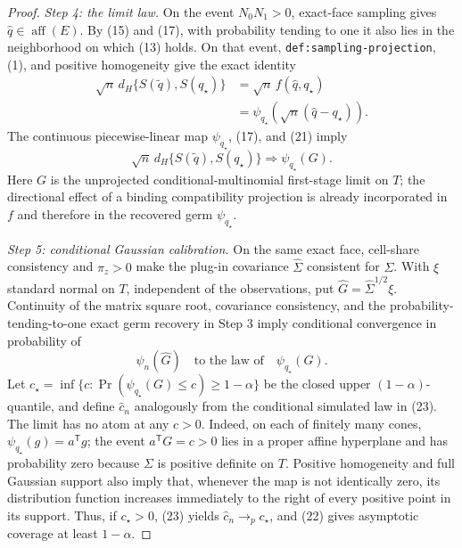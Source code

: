 \documentclass{article}
\begin{document}
\begin{proof}
\emph{Step 4: the limit law.}
On the event \(N_0N_1>0\), exact-face sampling gives \(\widehat q\in\operatorname{aff}(E)\).  By (15) and (17), with probability tending to one it also lies in the neighborhood on which (13) holds.  On that event, \texttt{def:sampling-projection}, (1), and positive homogeneity give the exact identity
\[
\begin{split}
 \sqrt n\,d_H\{S(\widetilde q),S(q_\star)\}
 &=\sqrt n\,f(\widehat q,q_\star)\\
 &=\psi_{q_\star}\!\left(\sqrt n(\widehat q-q_\star)\right).
\end{split}
\tag{21}
\]
The continuous piecewise-linear map \(\psi_{q_\star}\), (17), and (21) imply
\[
 \sqrt n\,d_H\{S(\widetilde q),S(q_\star)\}
 \Rightarrow \psi_{q_\star}(G).
\tag{22}
\]
Here \(G\) is the unprojected conditional-multinomial first-stage limit on \(T\); the directional effect of a binding compatibility projection is already incorporated in \(f\) and therefore in the recovered germ \(\psi_{q_\star}\).

\emph{Step 5: conditional Gaussian calibration.}
On the same exact face, cell-share consistency and \(\pi_z>0\) make the plug-in covariance \(\widehat\Sigma\) consistent for \(\Sigma\).  With \(\xi\) standard normal on \(T\), independent of the observations, put \(\widehat G=\widehat\Sigma^{1/2}\xi\).  Continuity of the matrix square root, covariance consistency, and the probability-tending-to-one exact germ recovery in Step 3 imply conditional convergence in probability of
\[
 \widehat\psi_n(\widehat G)
 \quad\text{to the law of}\quad
 \psi_{q_\star}(G).
\tag{23}
\]
Let \(c_\star=\inf\{c:\Pr(\psi_{q_\star}(G)\leq c)\geq1-\alpha\}\) be the closed upper \((1-\alpha)\)-quantile, and define \(\widehat c_n\) analogously from the conditional simulated law in (23).  The limit has no atom at any \(c>0\).  Indeed, on each of finitely many cones, \(\psi_{q_\star}(g)=a^{\mathsf T}g\); the event \(a^{\mathsf T}G=c>0\) lies in a proper affine hyperplane and has probability zero because \(\Sigma\) is positive definite on \(T\).  Positive homogeneity and full Gaussian support also imply that, whenever the map is not identically zero, its distribution function increases immediately to the right of every positive point in its support.  Thus, if \(c_\star>0\), (23) yields \(\widehat c_n\to_p c_\star\), and (22) gives asymptotic coverage at least \(1-\alpha\).


\end{proof}
\end{document}
